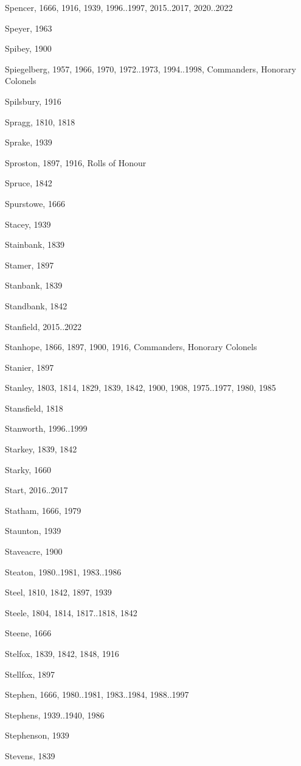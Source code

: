 \begin{theindex}
\item Spencer, 1666, 1916, 1939, 1996..1997, 2015..2017, 2020..2022
\item Speyer, 1963
\item Spibey, 1900
\item Spiegelberg, 1957, 1966, 1970, 1972..1973, 1994..1998, Commanders, Honorary Colonels
\item Spilsbury, 1916
\item Spragg, 1810, 1818
\item Sprake, 1939
\item Sproston, 1897, 1916, Rolls of Honour
\item Spruce, 1842
\item Spurstowe, 1666
\item Stacey, 1939
\item Stainbank, 1839
\item Stamer, 1897
\item Stanbank, 1839
\item Standbank, 1842
\item Stanfield, 2015..2022
\item Stanhope, 1866, 1897, 1900, 1916, Commanders, Honorary Colonels
\item Stanier, 1897
\item Stanley, 1803, 1814, 1829, 1839, 1842, 1900, 1908, 1975..1977, 1980, 1985
\item Stansfield, 1818
\item Stanworth, 1996..1999
\item Starkey, 1839, 1842
\item Starky, 1660
\item Start, 2016..2017
\item Statham, 1666, 1979
\item Staunton, 1939
\item Staveacre, 1900
\item Steaton, 1980..1981, 1983..1986
\item Steel, 1810, 1842, 1897, 1939
\item Steele, 1804, 1814, 1817..1818, 1842
\item Steene, 1666
\item Stelfox, 1839, 1842, 1848, 1916
\item Stellfox, 1897
\item Stephen, 1666, 1980..1981, 1983..1984, 1988..1997
\item Stephens, 1939..1940, 1986
\item Stephenson, 1939
\item Stevens, 1839

\end{theindex}
